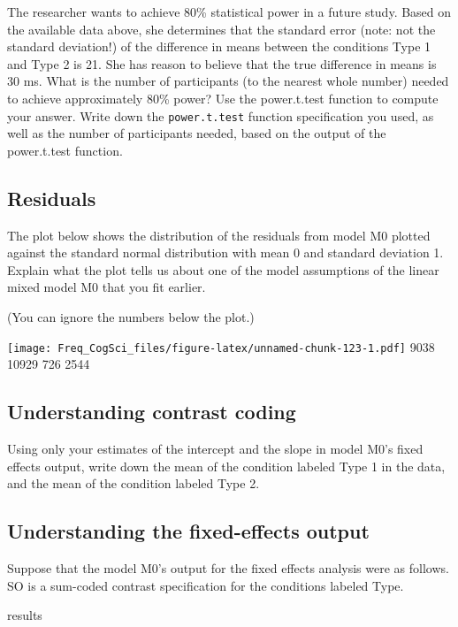 \documentclass[12pt,]{krantz}
\newenvironment{Shaded}{\begin{snugshade}}{\end{snugshade}}
\newcommand{\NormalTok}[1]{#1}
\begin{document}
The researcher wants to achieve 80\% statistical power in a future study. Based on the available data above, she determines that the standard error (note: not the standard deviation!) of the difference in means between the conditions Type 1 and Type 2 is 21. She has reason to believe that the true difference in means is 30 ms. What is the number of participants (to the nearest whole number) needed to achieve approximately 80\% power? Use the power.t.test function to compute your answer. Write down the \texttt{power.t.test} function specification you used, as well as the number of participants needed, based on the output of the power.t.test function.

\hypertarget{sec:LMExercisesPart5}{%
\subsection{Residuals}\label{sec:LMExercisesPart5}}

The plot below shows the distribution of the residuals from model M0 plotted against the standard normal distribution with mean 0 and standard deviation 1. Explain what the plot tells us about one of the model assumptions of the linear mixed model M0 that you fit earlier.

(You can ignore the numbers below the plot.)

\texttt{[image: Freq\_CogSci\_files/figure-latex/unnamed-chunk-123-1.pdf]} 9038 10929
726 2544

\hypertarget{sec:LMExercisesPart6}{%
\subsection{Understanding contrast coding}\label{sec:LMExercisesPart6}}

Using only your estimates of the intercept and the slope in model M0's fixed effects output, write down the mean of the condition labeled Type 1 in the data, and the mean of the condition labeled Type 2.

\hypertarget{sec:LMExercisesPart7}{%
\subsection{Understanding the fixed-effects output}\label{sec:LMExercisesPart7}}

Suppose that the model M0's output for the fixed effects analysis were as follows. SO is a sum-coded contrast specification for the conditions labeled Type.

\begin{Shaded}
\begin{Highlighting}[]
\NormalTok{results}
\end{Highlighting}
\end{Shaded}
\end{document}

